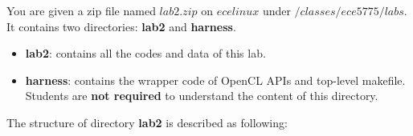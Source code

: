 \documentclass[paper=letter, fontsize=10pt]{scrartcl} %
\numberwithin{equation}{section} %
\numberwithin{figure}{section} %
\numberwithin{table}{section} %
\begin{document}

You are given a zip file named 
$lab2.zip$ on $ecelinux$ under $/classes/ece5775/labs$. It contains two directories: \textbf{lab2} and \textbf{harness}. 

\begin{itemize}
	\item \textbf{lab2}: contains all the codes and data of this lab.
	\item \textbf{harness}: contains the wrapper code of OpenCL APIs and top-level makefile. Students are \textbf{not required} to understand the content of this directory.
\end{itemize}

The structure of directory \textbf{lab2} is described as following:
\end{document}
